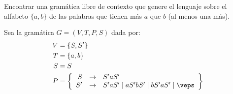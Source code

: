 \begin{ejercicio}
    Encontrar una gramática libre de contexto que genere el lenguaje sobre el alfabeto $\{a, b\}$ de las palabras que tienen más $a$ que $b$ (al menos una más).

    Sea la gramática $G=\left(V,T,P,S\right)$ dada por:
    \begin{align*}
        V &= \{S, S'\} \\
        T &= \{a,b\} \\
        S &= S \\
        P &= \left\{
            \begin{array}{rcl}
                S &\rightarrow & S'aS'\\
                S' &\rightarrow & S'aS' \mid aS'bS' \mid bS'aS' \mid \veps
            \end{array}
        \right\}
    \end{align*}
\end{ejercicio}

